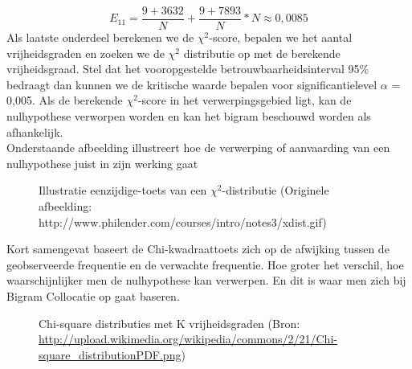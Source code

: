\[{E_11} = \frac{9+3632}{N}+\frac{9+7893}{N} * N \approx 0,0085 \]
\newline
Als laatste onderdeel berekenen we de ${\chi}^2$-score, bepalen we het aantal vrijheidsgraden en zoeken we de ${\chi}^2$ distributie op met de berekende vrijheidsgraad. Stel dat het vooropgestelde betrouwbaarheidsinterval 95\% bedraagt dan kunnen we de kritische waarde bepalen voor significantielevel $\alpha$ = 0,005.
Als de berekende ${\chi}^2$-score in het verwerpingsgebied ligt, kan de nulhypothese verworpen worden en kan het bigram beschouwd worden als afhankelijk.\\
%
Onderstaande afbeelding illustreert hoe de verwerping of aanvaarding van een nulhypothese juist in zijn werking gaat
%
\begin{figure}[h]%
    \centering
    \caption{Illustratie eenzijdige-toets van een ${\chi}^2$-distributie (Originele afbeelding: http://www.philender.com/courses/intro/notes3/xdist.gif)}%
\end{figure}
\newline
Kort samengevat baseert de Chi-kwadraattoets zich op de afwijking tussen de geobserveerde frequentie en de verwachte frequentie. Hoe groter het verschil, hoe waarschijnlijker men de nulhypothese kan verwerpen. En dit is waar men zich bij Bigram Collocatie op gaat baseren.

\begin{figure}[h]%
    \centering
    \caption{Chi-square distributies met K vrijheidsgraden (Bron: \url{http://upload.wikimedia.org/wikipedia/commons/2/21/Chi-square_distributionPDF.png})}%
\end{figure}

